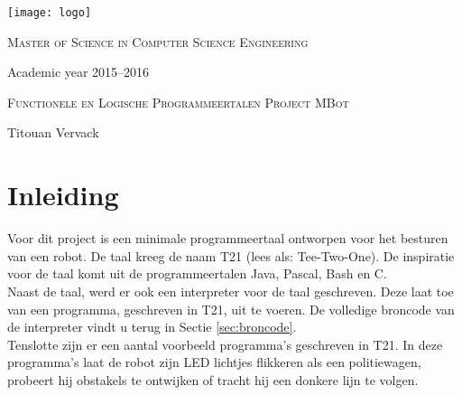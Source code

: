 \documentclass[a4paper]{article}
\begin{document}
\begin{titlepage}
\fontsize{12pt}{14pt}\selectfont

\begin{center}

\texttt{[image: logo]}

\vspace{1cm}

\fontsize{14pt}{17pt}\selectfont
\textsc{Master of Science in Computer Science Engineering}
\fontsize{12pt}{14pt}\selectfont
\vspace{0.3cm}

\vspace{1.2cm}

Academic year 2015--2016

\vspace{2.8cm}

\fontsize{17.28pt}{21pt}\selectfont

\textsc{Functionele en Logische Programmeertalen}
\fontsize{14.28pt}{21pt}\selectfont
\textsc{Project MBot}

\fontsize{12pt}{14pt}\selectfont

\vspace{2.8cm}

Titouan Vervack

\end{center}
\end{titlepage}
\newpage
\fontsize{12pt}{16pt}\selectfont
\section{Inleiding}
Voor dit project is een minimale programmeertaal ontworpen voor het besturen van een robot. De taal kreeg de naam T21 (lees als: Tee-Two-One). De inspiratie voor de taal komt uit de programmeertalen Java, Pascal, Bash en C.\\
Naast de taal, werd er ook een interpreter voor de taal geschreven. Deze laat toe van een programma, geschreven in T21, uit te voeren. De volledige broncode van de interpreter vindt u terug in Sectie \ref{sec:broncode}.\\
Tenslotte zijn er een aantal voorbeeld programma's geschreven in T21. In deze programma's laat de robot zijn LED lichtjes flikkeren als een politiewagen, probeert hij obstakels te ontwijken of tracht hij een donkere lijn te 
volgen.
\end{document}
